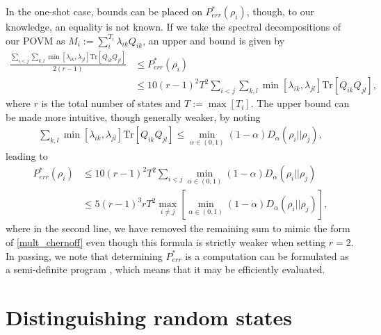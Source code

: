 \documentclass[a4paper,11pt]{article}
\newcommand{\Tr}{\text{Tr}}
\begin{document}
In the one-shot case, bounds can be placed on $P_{err}^*(\rho_i)$, though, to our knowledge, an equality is not known. If we take the spectral decompositions of our POVM as $M_i := \sum_i^{T_i}\lambda_{ik}Q_{ik}$, an upper and  bound is given by \cite{2015arXiv150806624L}
\begin{align}
    \frac{\sum_{i<j}\sum_{k,l}\min\left[\lambda_{ik},\lambda_{jl} \right]\Tr \left[Q_{ik} Q_{jl} \right]}{2(r-1)} &\leq P_{err}^*(\rho_i)\nonumber
    \\
    &\leq 10(r-1)^2 T^2\sum_{i<j}\sum_{k,l}\min\left[\lambda_{ik},\lambda_{jl} \right]\Tr \left[Q_{ik} Q_{jl} \right],
\end{align}
where $r$ is the total number of states and $T:= \max\left[T_i\right]$. The upper bound can be made more intuitive, though generally weaker, by noting
\begin{align}
    \sum_{k,l}\min\left[\lambda_{ik},\lambda_{jl} \right]\Tr \left[Q_{ik} Q_{jl} \right] \leq \min_{\alpha \in (0,1)}(1-\alpha )D_{\alpha}(\rho_i ||\rho_j),
\end{align}
leading to 
\begin{align}
    P_{err}^*(\rho_i) &\leq 10(r-1)^2 T^2\sum_{i<j}\min_{\alpha \in (0,1)}(1-\alpha )D_{\alpha}(\rho_i ||\rho_j)
    \nonumber
    \\
    &\leq 5(r-1)^3r T^2\max_{i\neq j}\left[ \min_{\alpha \in (0,1)}(1-\alpha )D_{\alpha}(\rho_i ||\rho_j)\right],
\end{align}
where in the second line, we have removed the remaining sum to mimic the form of \eqref{mult_chernoff} even though this formula is strictly weaker when setting $r = 2$.
In passing, we note that determining $P^*_{err}$ is a computation can be formulated as a semi-definite program \cite{1055351, 2020arXiv201104672K}, which means that it may be efficiently evaluated.

\section{Distinguishing random states}

\label{randomstate_sec}
\end{document}
